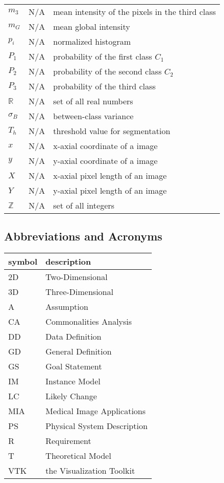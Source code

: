 \documentclass[12pt]{article}
\newcommand{\famname}{MIA} %
\begin{document}
\begin{longtable*}{l l p{12cm}}
$m_{3}$ & N/A & mean intensity of the pixels in the third class
\\
$m_{G}$ & N/A & mean global intensity
\\
$p_{i}$ & N/A & normalized histogram
\\
$P_{1}$ & N/A & probability of the first class $C_{1}$
\\
$P_{2}$ & N/A & probability of the second class $C_{2}$
\\
$P_{3}$ & N/A & probability of the third class
\\
$\mathbb{R}$ & N/A & set of all real numbers
\\
$\sigma_{B}$ & N/A & between-class variance
\\
$T_{h}$ & N/A & threshold value for segmentation
\\
$x$ & N/A & x-axial coordinate of a image
\\
$y$ & N/A & y-axial coordinate of a image
\\
$X$ & N/A & x-axial pixel length of an image
\\
$Y$ & N/A & y-axial pixel length of an image
\\
$\mathbb{Z}$ & N/A & set of all integers
\\ 
\bottomrule
\end{longtable*}

\subsection{Abbreviations and Acronyms}

\renewcommand{\arraystretch}{1.2}
\begin{tabular}{l l} 
  \toprule		
  \textbf{symbol} & \textbf{description}\\
  \midrule 
  2D & Two-Dimensional\\
  3D & Three-Dimensional\\
  A & Assumption\\
  CA & Commonalities Analysis\\
  DD & Data Definition\\
  GD & General Definition\\
  GS & Goal Statement\\
  IM & Instance Model\\
  LC & Likely Change\\
  \famname & Medical Image Applications\\
  PS & Physical System Description\\
  R & Requirement\\
  T & Theoretical Model\\
  VTK & the Visualization Toolkit\\
  \bottomrule
\end{tabular}\\
\end{document}
